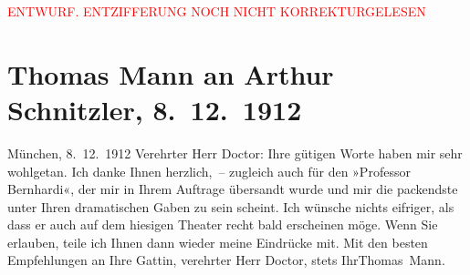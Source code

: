 
\begin{center}
            \textcolor{red}{ENTWURF. ENTZIFFERUNG NOCH NICHT KORREKTURGELESEN}
                      \end{center}
            
               \section[Thomas Mann an Arthur Schnitzler, 8. 12. 1912]{ Thomas Mann an Arthur Schnitzler, 8. 12. 1912}\nopagebreak{}\rehead{ }\begin{ledgroupsized}[t]{13cm}\normalsize\beginnumbering{} \toendnotes[C]{\smallbreak\pagebreak[2]} 
\toendnotes[C]{\smallbreak}\pstart
           \raggedleft{}{\pb}München, 8. 12. 1912\pend
           \pstart
           Verehrter Herr Doctor: Ihre gütigen Worte haben mir sehr wohlgetan. Ich danke
                    Ihnen herzlich, – zugleich auch für den »Professor
                        Bernhardi«, der mir in Ihrem Auftrage übersandt wurde und mir die
                    packendste unter Ihren dramatischen Gaben zu sein scheint. Ich wünsche nichts
                    eifriger, als dass er auch auf dem hiesigen Theater recht bald erscheinen möge.
                    Wenn Sie erlauben, teile ich Ihnen dann wieder meine Eindrücke mit.\pend
           \pstart
           Mit den besten Empfehlungen an Ihre Gattin, verehrter Herr Doctor, stets Ihr\hspace*{1.5em}\spacefill\mbox{Thomas Mann.}\pend
           \endnumbering{}\end{ledgroupsized}  \newcommand{\dateiname}{L02108}\newcommand{\titel}{Thomas Mann an Arthur Schnitzler, 8. 12. 1912}\newcommand{\editorInnen}{Martin Anton Müller und Gerd-Hermann Susen}
      